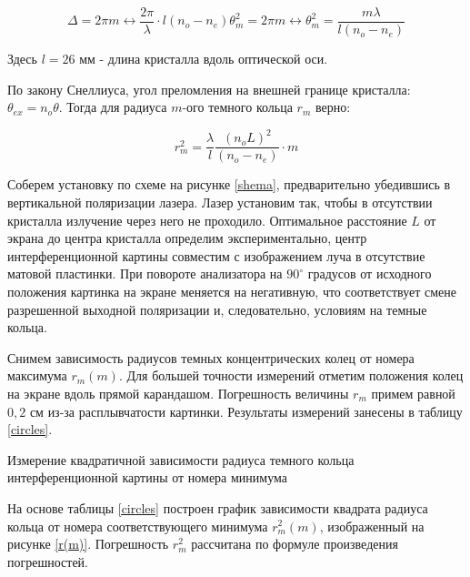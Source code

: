 \documentclass[a4paper, 12pt]{article}%
\begin{document}
	\[ \Delta = 2\pi m \leftrightarrow \frac{2\pi}{\lambda}\cdot l (n_o - n_e)\theta_m^2 = 2\pi m \leftrightarrow \theta_m^2 = \frac{m\lambda}{l(n_o - n_e)} \] 
	
	Здесь $l = 26$ мм - длина кристалла вдоль оптической оси.
	
	По закону Снеллиуса, угол преломления на внешней границе кристалла: $\theta_{ex} = n_o\theta$. Тогда для радиуса $m$-ого темного кольца $r_m$ верно: 

	\begin{equation}	
		r_m^2 = \frac{\lambda}{l} \frac{(n_oL)^2}{(n_o - n_e)} \cdot m
	\end{equation}
	
	Соберем установку по схеме на рисунке \ref{shema}, предварительно убедившись в вертикальной поляризации лазера. Лазер установим так, чтобы в отсутствии кристалла излучение через него не проходило. Оптимальное расстояние $L$ от экрана до центра кристалла определим экспериментально, центр интерференционной картины совместим с изображением луча в отсутствие матовой пластинки. При повороте анализатора на $90^\circ$ градусов от исходного положения картинка на экране меняется на негативную, что соответствует смене разрешенной выходной поляризации и, следовательно, условиям на темные кольца. 
	
	Снимем зависимость радиусов темных концентрических колец от номера максимума $r_m(m)$. Для большей точности измерений отметим положения колец на экране вдоль прямой карандашом. Погрешность величины $r_m$ примем равной $0,2$ см из-за расплывчатости картинки. Результаты измерений занесены в таблицу \ref{circles}. 
	
	\begin{table}[h]
		\centering
		
		\caption{Измерение квадратичной зависимости радиуса темного кольца интерференционной картины от номера минимума}
		\label{circles}
	\end{table}	
	
	На основе таблицы \ref{circles} построен график зависимости квадрата радиуса кольца от номера соответствующего минимума $r_m^2(m)$, изображенный на рисунке \ref{r(m)}. Погрешность $r_m^2$ рассчитана по формуле произведения погрешностей. 
	
\end{document}
